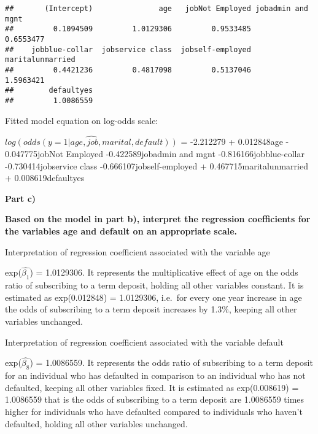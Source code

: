 \documentclass[
]{article}
\newenvironment{Shaded}{\begin{snugshade}}{\end{snugshade}}
\newcommand{\FunctionTok}[1]{\textcolor[rgb]{0.00,0.00,0.00}{#1}}
\newcommand{\NormalTok}[1]{#1}
\newcommand{\SpecialCharTok}[1]{\textcolor[rgb]{0.00,0.00,0.00}{#1}}
\begin{document}
\begin{Shaded}
\end{Shaded}

\begin{verbatim}
##       (Intercept)               age   jobNot Employed jobadmin and mgnt 
##         0.1094509         1.0129306         0.9533485         0.6553477 
##    jobblue-collar  jobservice class  jobself-employed  maritalunmarried 
##         0.4421236         0.4817098         0.5137046         1.5963421 
##        defaultyes 
##         1.0086559
\end{verbatim}

Fitted model equation on log-odds scale:

\(\hat{log(odds(y=1|age,job,marital,default))}\) = -2.212279 +
0.012848age - 0.047775jobNot Employed -0.422589jobadmin and mgnt
-0.816166jobblue-collar -0.730414jobservice class
-0.666107jobself-employed + 0.467715maritalunmarried +
0.008619defaultyes

\textbf{Part c)}

\textbf{Based on the model in part b), interpret the regression
coefficients for the variables age and default on an appropriate scale.}

Interpretation of regression coefficient associated with the variable
age

exp(\(\hat{\beta_1}\)) = 1.0129306. It represents the multiplicative
effect of age on the odds ratio of subscribing to a term deposit,
holding all other variables constant. It is estimated as exp(0.012848) =
1.0129306, i.e.~for every one year increase in age the odds of
subscribing to a term deposit increases by 1.3\%, keeping all other
variables unchanged.

Interpretation of regression coefficient associated with the variable
default

exp(\(\hat{\beta_8}\)) = 1.0086559. It represents the odds ratio of
subscribing to a term deposit for an individual who has defaulted in
comparison to an individual who has not defaulted, keeping all other
variables fixed. It is estimated as exp(0.008619) = 1.0086559 that is
the odds of subscribing to a term deposit are 1.0086559 times higher for
individuals who have defaulted compared to individuals who haven't
defaulted, holding all other variables unchanged.
\end{document}
